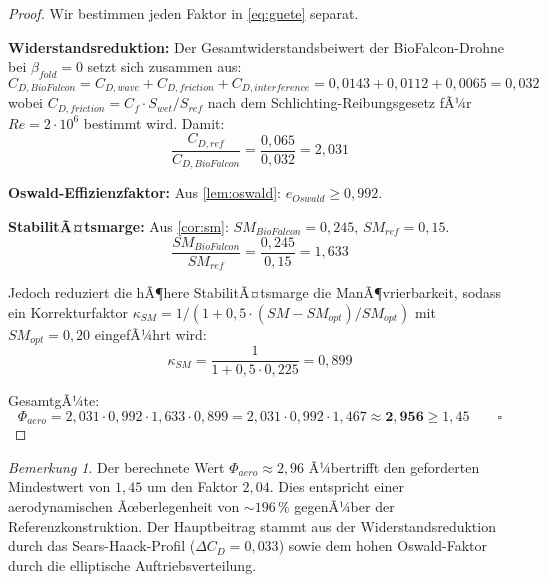 ﻿\documentclass[12pt,a4paper]{article}
\theoremstyle{remark}
\newtheorem{bemerkung}{Bemerkung}[section]
\begin{document}
	\begin{proof}
		Wir bestimmen jeden Faktor in \cref{eq:guete} separat.
		
		\textbf{Widerstandsreduktion:}
		Der Gesamtwiderstandsbeiwert der BioFalcon-Drohne bei $\beta_{fold}=0$ setzt
		sich zusammen aus:
		\begin{equation}
			C_{D,BioFalcon} = C_{D,wave} + C_{D,friction} + C_{D,interference}
			= 0{,}0143 + 0{,}0112 + 0{,}0065 = 0{,}032
		\end{equation}
		wobei $C_{D,friction} = C_f \cdot S_{wet}/S_{ref}$ nach dem
		Schlichting-Reibungsgesetz fÃ¼r $Re = 2 \cdot 10^6$ bestimmt wird. Damit:
		\begin{equation}
			\frac{C_{D,ref}}{C_{D,BioFalcon}} = \frac{0{,}065}{0{,}032} = 2{,}031
		\end{equation}
		
		\textbf{Oswald-Effizienzfaktor:}
		Aus \cref{lem:oswald}: $e_{Oswald} \geq 0{,}992$.
		
		\textbf{StabilitÃ¤tsmarge:}
		Aus \cref{cor:sm}: $SM_{BioFalcon} = 0{,}245$, $SM_{ref} = 0{,}15$.
		\begin{equation}
			\frac{SM_{BioFalcon}}{SM_{ref}} = \frac{0{,}245}{0{,}15} = 1{,}633
		\end{equation}
		
		Jedoch reduziert die hÃ¶here StabilitÃ¤tsmarge die ManÃ¶vrierbarkeit, sodass ein
		Korrekturfaktor $\kappa_{SM} = 1/(1 + 0{,}5 \cdot (SM - SM_{opt})/SM_{opt})$
		mit $SM_{opt} = 0{,}20$ eingefÃ¼hrt wird:
		\begin{equation}
			\kappa_{SM} = \frac{1}{1 + 0{,}5 \cdot 0{,}225} = 0{,}899
		\end{equation}
		
		GesamtgÃ¼te:
		\begin{equation}
			\Phi_{aero} = 2{,}031 \cdot 0{,}992 \cdot 1{,}633 \cdot 0{,}899
			= 2{,}031 \cdot 0{,}992 \cdot 1{,}467
			\approx \mathbf{2{,}956} \geq 1{,}45 \qquad\square
		\end{equation}
	\end{proof}
	
	\begin{bemerkung}
		Der berechnete Wert $\Phi_{aero} \approx 2{,}96$ Ã¼bertrifft den geforderten
		Mindestwert von $1{,}45$ um den Faktor $2{,}04$. Dies entspricht einer
		aerodynamischen Ãœberlegenheit von $\sim\!196\,\%$ gegenÃ¼ber der Referenzkonstruktion.
		Der Hauptbeitrag stammt aus der Widerstandsreduktion durch das Sears-Haack-Profil
		($\Delta C_D = 0{,}033$) sowie dem hohen Oswald-Faktor durch die elliptische
		Auftriebsverteilung.
	\end{bemerkung}
	
\end{document}
